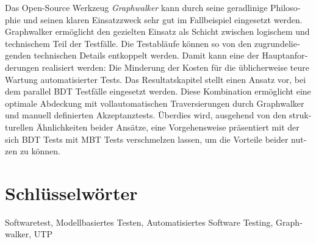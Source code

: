 \begin{otherlanguage}{ngerman}
Das Open-Source Werkzeug \textit{Graphwalker} kann durch seine geradlinige Philosophie und seinen klaren Einsatzzweck sehr gut im Fallbeispiel eingesetzt werden. Graphwalker ermöglicht den gezielten Einsatz als Schicht zwischen logischem und technischem Teil der Testfälle. Die Testabläufe können so von den zugrundeliegenden technischen Details entkoppelt werden. Damit kann eine der Hauptanforderungen realisiert werden: Die Minderung der Kosten für die üblicherweise teure Wartung automatisierter Tests. Das Resultatskapitel stellt einen Ansatz vor, bei dem parallel \Gls{BDT} Testfälle eingesetzt werden. Diese Kombination ermöglicht eine optimale Abdeckung mit vollautomatischen Traversierungen durch Graphwalker und manuell definierten Akzeptanztests. Überdies wird, ausgehend von den strukturellen Ähnlichkeiten beider Ansätze, eine Vorgehensweise präsentiert mit der sich \Gls{BDT} Tests mit \Gls{MBT} Tests verschmelzen lassen, um die Vorteile beider nutzen zu können.

\bigskip

  \section*{Schlüsselwörter}
  Softwaretest, Modellbasiertes Testen, Automatisiertes Software Testing, Graphwalker, UTP

\end{otherlanguage}

